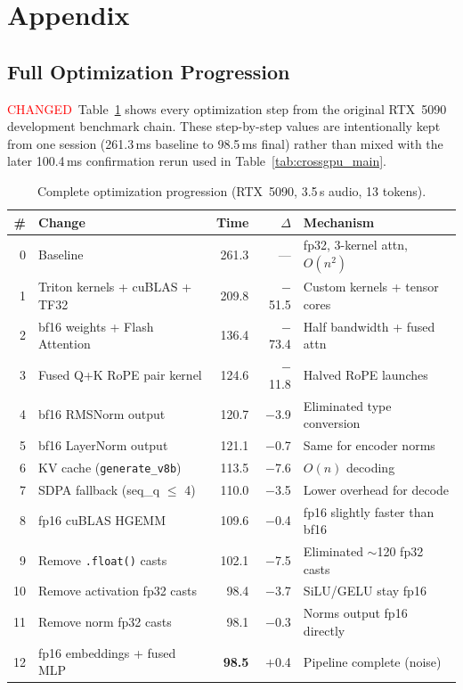 \documentclass{article}
\newcommand{\chg}[1]{{\color{blue}#1}}
\newcommand{\chglabel}{{\setlength{\fboxsep}{1pt}\colorbox{yellow!45}{\textcolor{red}{\scriptsize CHANGED}}}}
\begin{document}
\appendix
\section{Appendix}

\subsection{Full Optimization Progression}

\chglabel\ \chg{Table~\ref{tab:progression} shows every optimization step from the original RTX~5090 development benchmark chain.  These step-by-step values are intentionally kept from one session (261.3\,ms baseline to 98.5\,ms final) rather than mixed with the later 100.4\,ms confirmation rerun used in Table~\ref{tab:crossgpu_main}.}

\begin{table}[h]
\centering
\caption{Complete optimization progression (RTX~5090, 3.5\,s audio, 13 tokens).}
\label{tab:progression}
\small
\begin{tabular}{@{}rlrrl@{}}
\toprule
\textbf{\#} & \textbf{Change} & \textbf{Time} & \textbf{$\Delta$} & \textbf{Mechanism} \\
\midrule
0 & Baseline & 261.3 & --- & fp32, 3-kernel attn, $O(n^2)$ \\
1 & Triton kernels + cuBLAS + TF32 & 209.8 & $-$51.5 & Custom kernels + tensor cores \\
2 & bf16 weights + Flash Attention & 136.4 & $-$73.4 & Half bandwidth + fused attn \\
3 & Fused Q+K RoPE pair kernel & 124.6 & $-$11.8 & Halved RoPE launches \\
4 & bf16 RMSNorm output & 120.7 & $-$3.9 & Eliminated type conversion \\
5 & bf16 LayerNorm output & 121.1 & $-$0.7 & Same for encoder norms \\
6 & KV cache (\texttt{generate\_v8b}) & 113.5 & $-$7.6 & $O(n) $ decoding \\
7 & SDPA fallback (seq\_q $\leq$ 4) & 110.0 & $-$3.5 & Lower overhead for decode \\
8 & fp16 cuBLAS HGEMM & 109.6 & $-$0.4 & fp16 slightly faster than bf16 \\
9 & Remove \texttt{.float()} casts & 102.1 & $-$7.5 & Eliminated $\sim$120 fp32 casts \\
10 & Remove activation fp32 casts & 98.4 & $-$3.7 & SiLU/GELU stay fp16 \\
11 & Remove norm fp32 casts & 98.1 & $-$0.3 & Norms output fp16 directly \\
12 & fp16 embeddings + fused MLP & \textbf{98.5} & $+$0.4 & Pipeline complete (noise) \\
\bottomrule
\end{tabular}
\end{table}
\end{document}
